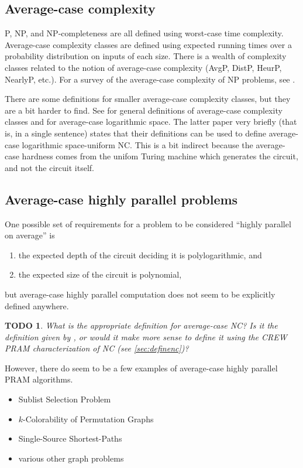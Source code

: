 \documentclass{article}
\newtheorem{todo}{TODO}
\begin{document}
\subsection{Average-case complexity}

\textsf{P}, \textsf{NP}, and \textsf{NP}-completeness are all defined using worst-case time complexity.
Average-case complexity classes are defined using expected running times over a probability distribution on inputs of each size.
There is a wealth of complexity classes related to the notion of average-case complexity (\textsf{AvgP}, \textsf{DistP}, \textsf{HeurP}, \textsf{NearlyP}, etc.).
For a survey of the average-case complexity of \textsf{NP} problems, see \cite{bt06}.

There are some definitions for smaller average-case complexity classes, but they are a bit harder to find.
See \cite[Section~3.5.1]{yamakami97} for general definitions of average-case complexity classes and \cite[Section~7]{bcgl89} for average-case logarithmic space.
The latter paper very briefly (that is, in a single sentence) states that their definitions can be used to define average-case logarithmic space-uniform \textsf{NC}.
This is a bit indirect because the average-case hardness comes from the unifom Turing machine which generates the circuit, and not the circuit itself.

\subsection{Average-case highly parallel problems}

One possible set of requirements for a problem to be considered ``highly parallel on average'' is
\begin{enumerate}
  \item the expected depth of the circuit deciding it is polylogarithmic, and
  \item the expected size of the circuit is polynomial,
\end{enumerate}
but average-case highly parallel computation does not seem to be explicitly defined anywhere.

\begin{todo}
  What is the appropriate definition for average-case \textsf{NC}?
  Is it the definition given by \cite{bcgl89}, or would it make more sense to define it using the CREW PRAM characterization of \textsf{NC} (see \autoref{sec:definenc})?
\end{todo}

However, there do seem to be a few examples of average-case highly parallel PRAM algorithms.
\begin{itemize}
\item Sublist Selection Problem \cite{pz91}
\item $k$-Colorability of Permutation Graphs \cite{an99}
\item Single-Source Shortest-Paths \cite{meyer02}
\item various other graph problems \cite{rs92}
\end{itemize}
\end{document}
